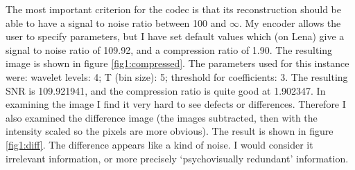 \documentclass[a4paper]{article}
\begin{document}
The most important criterion for the codec is that its reconstruction should be able to have a signal to noise ratio between 100 and $\infty$. My encoder allows the user to specify parameters, but I have set default values which (on Lena) give a signal to noise ratio of 109.92, and a compression ratio of 1.90. The resulting image is shown in figure \ref{fig1:compressed}. The parameters used for this instance were: wavelet levels: 4; T (bin size): 5; threshold for coefficients: 3. The resulting SNR is 109.921941, and the compression ratio is quite good at 1.902347. In examining the image I find it very hard to see defects or differences. Therefore I also examined the difference image (the images subtracted, then with the intensity scaled so the pixels are more obvious). The result is shown in figure \ref{fig1:diff}. The difference appears like a kind of noise. I would consider it irrelevant information, or more precisely `psychovisually redundant' information.
\end{document}
